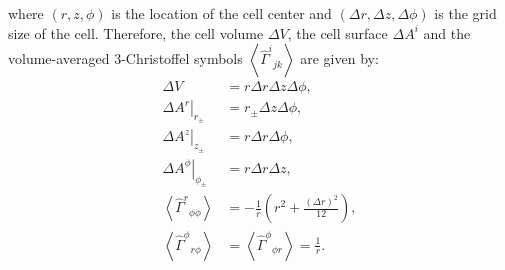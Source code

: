 where $\left(r,z,\phi\right)$ is the location of the cell center and $\left(\Delta r, \Delta z, \Delta \phi\right)$ is the grid size of the cell.
Therefore, the cell volume $\Delta V$, the cell surface $\Delta A^i$ and the volume-averaged 3-Christoffel symbols $\left\langle \hat{\Gamma}^i{}_{jk} \right\rangle$ are given by:
\begin{align}
    \Delta V &= r \Delta r \Delta z \Delta \phi, \\
    \left. \Delta A^r \right|_{r_\pm} &= r_\pm \Delta z \Delta \phi, \\
    \left. \Delta A^z \right|_{z_\pm} &= r \Delta r \Delta \phi, \\
    \left. \Delta A^\phi \right|_{\phi_\pm} &= r \Delta r \Delta z, \\
    \left\langle \hat{\Gamma}^r{}_{\phi\phi} \right\rangle &= -\frac{1}{r}\left(r^2 + \frac{\left(\Delta r\right)^2}{12} \right), \\
    \left\langle \hat{\Gamma}^\phi{}_{r\phi} \right\rangle &= \left\langle \hat{\Gamma}^\phi{}_{\phi r} \right\rangle = \frac{1}{r}.
\end{align}

